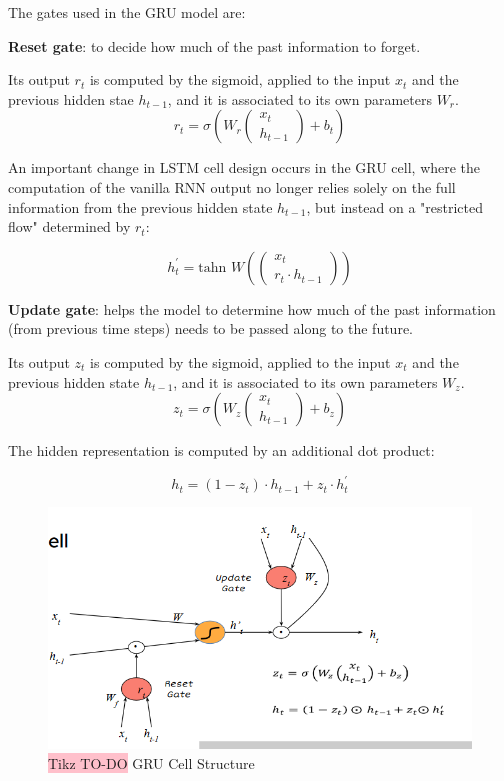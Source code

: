 The gates used in the GRU model are:

\textbf{Reset gate}:  to decide how much of the past information to forget.

Its output $r_t$ is computed by the sigmoid, applied to the input $x_t$ and the previous hidden stae $h_{t-1}$, and it is associated to its own parameters $W_r$. $$ r_t = \sigma(W_r
\begin{pmatrix}
x_t \\
h_{t-1}
\end{pmatrix} + b_t)
$$

An important change in LSTM cell design occurs in the GRU cell, where the computation of the vanilla RNN output no longer relies solely on the full information from the previous hidden state $h_{t−1}$, but instead on a "restricted flow" determined by $r_t$:

$$ h^{'}_t = \text{tahn }W(
\begin{pmatrix}
x_t \\
r_t \cdot h_{t-1}
\end{pmatrix})
$$



\textbf{Update gate}: helps the model to determine how much of
the past information (from previous time steps) needs to be passed along to the future.

Its output $z_t$ is computed by the sigmoid, applied to the input $x_t$ and the previous hidden state $h_{t-1}$, and it is associated to its own parameters $W_z$. $$ z_t = \sigma(W_z
\begin{pmatrix}
x_t \\
h_{t-1}
\end{pmatrix} + b_z)
$$

The hidden representation is computed by an additional dot product: 

$$h_t = (1-z_t)\cdot h_{t-1}+z_t \cdot h^{'}_t$$

\begin{figure}[!htbp]
    \centering
    \includegraphics[width=\linewidth]{tikz/chapter6 - GRU.png}
    \caption{{\color{red}\colorbox{pink}{Tikz TO-DO}} GRU Cell Structure}
\end{figure}

